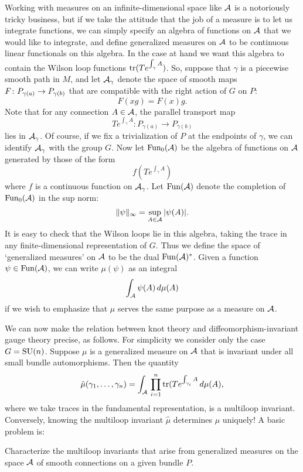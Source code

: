 Working with measures on an infinite-dimensional space like ${\cal A}$
is a notoriously tricky business, but if we take the attitude
that the job of a measure is to let us integrate functions,  we
can simply specify an algebra of functions on ${\cal A}$ that we would
like to integrate, and define generalized measures on ${\cal A}$ to be
continuous linear functionals on this algebra.  In the case at
hand we want this algebra to contain the Wilson loop functions
${\rm tr}( T e^{\int_\gamma A})$.  So, suppose that $\gamma$ is
a piecewise smooth path in $M$, and let ${\cal A}_\gamma$ denote the
space of smooth maps $F\colon P_{\gamma(a)} \rightarrow P_{\gamma(b)}$ that
are compatible with the right action of $G$ on $P$:
\[            F(xg) = F(x)g .\]
Note that for any connection $A \in {\cal A}$, the parallel transport
map
\[        T e^{\int_\gamma A}: P_{\gamma(a)} \to P_{\gamma(b)} \]
lies in ${\cal A}_\gamma$.  Of course, if we fix a
trivialization of $P$ at the endpoints of $\gamma$,
we can identify ${\cal A}_\gamma$ with the group $G$.    Now let
${\rm Fun}_0({\cal A})$ be the algebra of functions on ${\cal A}$ generated by
those of the form
\[            f(T e^{\int_\gamma A})  \]
where $f$ is a continuous function on ${\cal A}_\gamma$.  Let ${\rm Fun}({\cal A})$
denote the completion of ${\rm Fun}_0({\cal A})$ in the sup norm:
\[          \|\psi \|_\infty = \sup_{A \in {\cal A}} |\psi(A)|. \]
It is easy to check that the Wilson loops lie in this algebra,
taking the trace in any finite-dimensional representation of $G$.
Thus we define the space of `generalized measures' on ${\cal A}$
to be the dual ${\rm Fun}({\cal A})^\ast$.  Given a function $\psi \in {\rm Fun}({\cal A})$, we
can write $\mu(\psi)$ as an integral
\[          \int_{{\cal A}} \psi(A) \, d\mu(A) \]
if we wish to emphasize that $\mu$ serves the same purpose as a measure
on ${\cal A}$.

We can now make the relation between knot theory and
diffeomorphism-invariant gauge theory precise, as follows.  For
simplicity we consider only the case $G = {\rm SU}(n)$.
Suppose $\mu$ is a generalized measure on ${\cal A}$ that is invariant under
all small bundle automorphisms.  Then the quantity
\[  \hat \mu(\gamma_1, \dots, \gamma_n) =  \int_{\cal A} \,\prod_{i=1}^n {\rm tr}(T
e^{\int_{\gamma_i} A} \, d\mu(A), \]
where we take traces in the fundamental representation,
is a multiloop invariant.   Conversely, knowing the multiloop invariant
$\hat \mu$ determines $\mu$ uniquely!  A basic problem is:

\begin{problem}\et  Characterize the multiloop invariants
that arise from generalized measures on the
space ${\cal A}$ of smooth connections on a given bundle $P$.  \end{problem}

